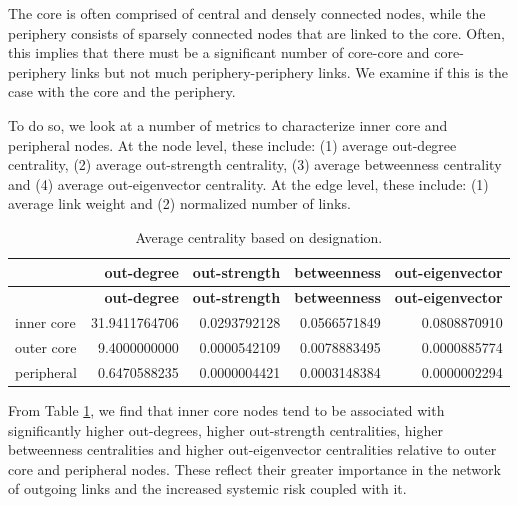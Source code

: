 \documentclass[12pt,letterpaper]{report}
\begin{document}
				The core is often comprised of central and densely connected nodes, while the periphery consists of sparsely connected nodes that are linked to the core. Often, this implies that there must be a significant number of core-core and core-periphery links but not much periphery-periphery links. We examine if this is the case with the core and the periphery.
				
				To do so, we look at a number of metrics to characterize inner core and peripheral nodes. At the node level, these include: (1) average out-degree centrality, (2) average out-strength centrality, (3) average betweenness centrality and (4) average out-eigenvector centrality. At the edge level, these include: (1) average link weight and (2) normalized number of links.
				
				\begin{longtable}{|l|r|r|r|r|}
					\caption{Average centrality based on designation. \label{tab:tab05AverageCentrality}} \\
					\hline
					& \textbf{\small out-degree} & \textbf{\small out-strength} & \textbf{\small betweenness} &
						\textbf{\small out-eigenvector} \\ 
					\hline
					\endfirsthead
					\hline
					& \textbf{out-degree} & \textbf{out-strength} & \textbf{betweenness} &
					\textbf{out-eigenvector} \\ 
					\hline
					\endhead
					\hline
					\endfoot
					inner core &  	31.9411764706 & 0.0293792128 & 0.0566571849 & 0.0808870910 \\
					outer core &  	9.4000000000 & 0.0000542109 & 0.0078883495 & 0.0000885774 \\
					peripheral & 0.6470588235  & 0.0000004421 & 0.0003148384 & 0.0000002294 \\
				\end{longtable}
				
				From Table \ref{tab:tab05AverageCentrality}, we find that inner core nodes tend to be associated with significantly higher out-degrees, higher out-strength centralities, higher betweenness centralities and higher out-eigenvector centralities relative to outer core and peripheral nodes. These reflect their greater importance in the network of outgoing links and the increased systemic risk coupled with it.
				
\end{document}
